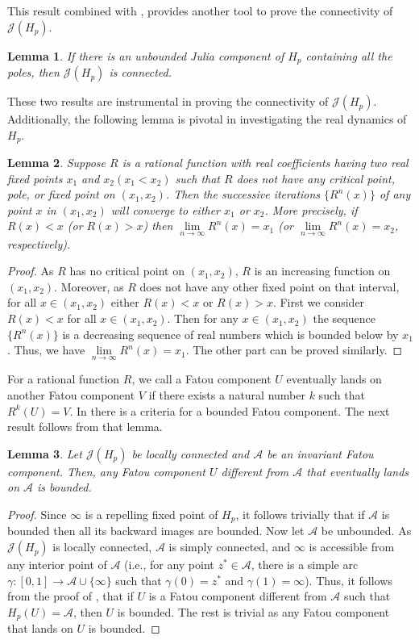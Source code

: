\documentclass[12pt]{article}
\newtheorem{lem}{Lemma}[section]
\begin{document}
This result combined with \cite[Lemma 3.5]{Sym_dyn}, provides another tool to prove the connectivity of $\mathcal{J}(H_p)$.
\begin{lem}\label{all_pole}
If there is an unbounded Julia component of $H_p$ containing all the poles, then $\mathcal{J}(H_p)$ is connected.
\end{lem}
These two results are instrumental in proving the connectivity of $\mathcal{J}(H_p)$. Additionally, the following lemma is pivotal in investigating the real dynamics of $H_p$.
\begin{lem}\label{gen_dyn}
Suppose $R$ is a rational function with real coefficients having two real fixed points $x_{1}$ and $x_{2}\left(x_{1}<x_{2}\right)$ such that $R$ does not have any critical point, pole, or fixed point on $(x_{1}, x_{2})$. Then  the successive iterations $\{R^n(x)\}$ of any point $x$ in $(x_{1}, x_{2})$ will converge to either $x_{1}$ or $x_{2}$. More precisely, if $R(x)<x$ (or $R(x)>x$) then $\lim\limits_{n \to \infty} R^n(x)=x_1$ (or $\lim\limits_{n \to \infty} R^n(x)=x_2$, respectively).
\end{lem}
\begin{proof}
As $R$ has no critical point on $(x_1, x_2)$, $R$ is an increasing function on $(x_1, x_2)$. Moreover, as $R$ does not have any other fixed point on that interval, for all $x\in(x_1, x_2)$ either $R(x)<x$ or $R(x)>x$. First we consider $R(x)<x$ for all $x\in(x_1, x_2)$. Then for any $x\in (x_1,x_2)$ the sequence $\{R^n(x)\}$ is a decreasing sequence of real numbers which is bounded below by $x_1$. Thus, we have $\lim\limits_{n \to \infty} R^n(x)=x_1$. The other part can be proved similarly.
\end{proof}
For a rational function $R$, we call a Fatou component $U$ eventually lands on another Fatou component $V$ if there exists a natural number $k$ such that $R^k(U)=V$. In \cite[Lemma~3.3]{Sym_dyn} there is a criteria for a bounded Fatou component. The next result follows from that lemma.
\begin{lem}\label{bdd_FC}
Let $\mathcal{J}(H_p)$ be locally connected and $\mathcal{A}$ be an invariant Fatou component. Then, any Fatou component $U$ different from $\mathcal{A}$ that eventually lands on $\mathcal{A}$ is bounded.
\end{lem}
\begin{proof}
Since $\infty$ is a repelling fixed point of $H_p$, it follows trivially that if $\mathcal{A}$ is bounded then all its backward images are bounded. Now let $\mathcal{A}$ be unbounded. As $\mathcal{J}(H_p)$ is locally connected, $\mathcal{A}$ is simply connected, and $\infty$ is accessible from any interior point of $\mathcal{A}$ (i.e., for any point $z^*\in \mathcal{A}$, there is a simple arc $\gamma:[0,1]\to \mathcal{A}\cup \{\infty\}$ such that $\gamma(0)=z^*$ and $\gamma(1)=\infty$). Thus, it follows from the proof of \cite[Lemma 3.3]{Sym_dyn}, that if $U$ is a Fatou component different from $\mathcal{A}$ such that $H_p(U)=\mathcal{A}$, then $U$ is bounded. The rest is trivial as any Fatou component that lands on $U$ is bounded.
\end{proof}
\end{document}
